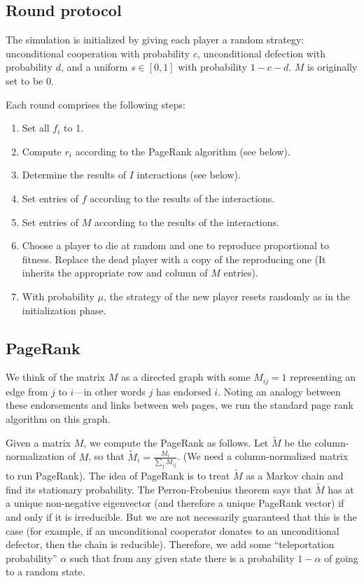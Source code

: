 \documentclass{amsart}
\begin{document}
\subsection{Round protocol}
The simulation is initialized by giving each player a random strategy: unconditional cooperation with probability $c$, unconditional defection with probability $d$, and a uniform $s \in [0,1]$ with probability $1 - c- d$. $M$ is originally set to be $0$. 

Each round comprises the following steps:

\begin{enumerate}
\item Set all $f_i$ to 1.
\item Compute $r_i$ according to the PageRank algorithm (see below).
\item Determine the results of $I$ interactions (see below).
\item Set entries of $f$ according to the results of the interactions.
\item Set entries of $M$ according to the results of the interactions.
\item Choose a player to die at random and one to reproduce proportional to fitness. Replace the dead player with a copy of the reproducing one (It inherits the appropriate row and column of $M$ entries). 
\item With probability $\mu$, the strategy of the new player resets randomly as in the initialization phase.
\end{enumerate}

\subsection{PageRank}
\newcommand{\tM}{\tilde M}
We think of the matrix $M$ as a directed graph with some $M_{ij} = 1$ representing an edge from $j$ to $i$---in other words $j$ has endorsed $i$. Noting an analogy between these endorsements and links between web pages, we run the standard page rank algorithm on this graph.

Given a matrix $M$, we compute the PageRank as follows. Let $\tM$ be the column-normalization of $M$, so that $\tM_i = \frac{M_i}{\sum_j M_{ij}}$. (We need a column-normalized matrix to run PageRank). The idea of PageRank is to treat $\tM$ as a Markov chain and find its stationary probability. The Perron-Frobenius theorem says that $\tM$ has at a unique non-negative eigenvector (and therefore a unique PageRank vector) if and only if it is irreducible. But we are not necessarily guaranteed that this is the case (for example, if an unconditional cooperator donates to an unconditional defector, then the chain is reducible). Therefore, we add some ``teleportation probability'' $\alpha$ such that from any given state there is a probability $1-\alpha$ of going to a random state.
\end{document}
